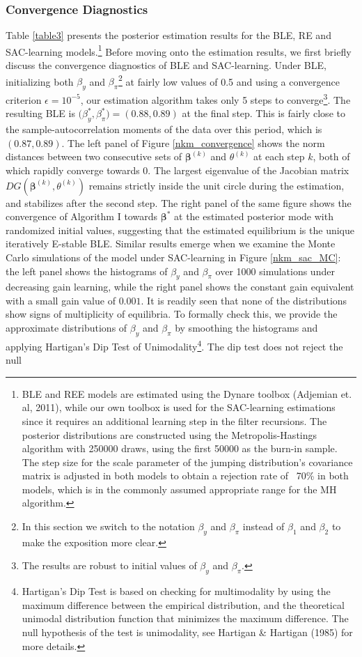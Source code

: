 \subsubsection*{Convergence Diagnostics}
Table \ref{table3} presents the posterior estimation results for the BLE, RE and SAC-learning models.\footnote{BLE and REE models are estimated using the Dynare toolbox (Adjemian et. al, 2011), while our own toolbox is used for the SAC-learning estimations since it requires an additional learning step in the filter recursions. The posterior distributions are constructed using the Metropolis-Hastings algorithm with 250000 draws, using the first 50000 as the burn-in sample. The step size for the scale parameter of the jumping distribution's covariance matrix is adjusted in both models to obtain a rejection rate of ~70\% in both models, which is in the commonly assumed {appropriate} range for the MH algorithm.} Before moving onto the estimation results, we first briefly discuss the convergence diagnostics of {BLE} and SAC-learning. Under BLE, initializing both $\beta_y$ and $\beta_{\pi}$\footnote{In this section we switch to the notation $\beta_y$ and $\beta_{\pi}$ instead of $\beta_1$ and $\beta_2$ to make the exposition more clear.} at fairly low values of 0.5 and using a convergence criterion $\epsilon=10^{-5}$, our estimation algorithm takes only 5 steps to converge\footnote{The results are robust to initial values of $\beta_y$ and $\beta_{\pi}$.}. The resulting BLE is $\boldsymbol (\beta_y^{*},\beta_{\pi}^{*})=(0.88,0.89)$ at the final step. This is fairly close to the sample-autocorrelation moments of the data over this period, which is $(0.87,0.89)$. The left panel of Figure \ref{nkm_convergence} shows the norm distances between two consecutive sets of $\pmb{\beta}^{(k)}$ and $\theta^{(k)}$ at each step $k$, both of which rapidly converge towards 0. The largest eigenvalue of the Jacobian matrix $DG(\pmb{\beta}^{(k)},\theta^{(k)})$ remains strictly inside the unit circle during the estimation, and stabilizes after the second step. The right panel of the same figure shows the convergence of Algorithm I towards $\pmb{ \beta}^{*} $ at the estimated posterior mode with randomized initial values, suggesting that the estimated equilibrium is the unique iteratively E-stable BLE. Similar results emerge when we examine the Monte Carlo simulations of the model under SAC-learning in Figure  \ref{nkm_sac_MC}: the left panel shows the histograms of $\beta_y$ and $\beta_{\pi}$ over 1000 simulations under decreasing gain learning, while the right panel shows the constant gain equivalent with a small gain value of $0.001$. It is readily seen that none of the distributions show signs of multiplicity of equilibria. To formally check this, we provide the approximate distributions of $\beta_y$ and $\beta_{\pi}$ by smoothing the histograms and applying Hartigan's Dip Test of Unimodality\footnote{Hartigan's Dip Test is based on checking for multimodality by using the maximum difference between the empirical distribution, and the theoretical unimodal distribution function that minimizes the maximum difference. The null hypothesis of the test is unimodality, see Hartigan \& Hartigan (1985) for more details.}. The dip test  does not reject the null 